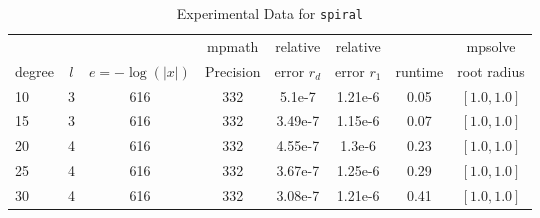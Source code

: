 \documentclass[sigconf]{acmart}
\begin{document}
%

\begin{table}[t]
\caption{Experimental Data for \texttt{spiral}} %
\label{tab:spiral}
\vskip -0.15in
\begin{center}
\begin{small}
\begin{sc}
\begin{tabular}{lccccccc}
\toprule
&  &  & mpmath & relative  & relative &  & mpsolve \\
degree  & $l$& $e=-\log(|x|)$& Precision &error $r_d$       & error $r_1$ &runtime& root radius\\
\midrule
 10 & 3 & 616 & 332 & 5.1e-7 & 1.21e-6 & 0.05 & $[1.0, 1.0]$\\
 15 & 3 & 616 & 332 & 3.49e-7 & 1.15e-6 & 0.07 & $[1.0, 1.0]$\\
 20 & 4 & 616 & 332 & 4.55e-7 & 1.3e-6 & 0.23 & $[1.0, 1.0]$\\
 25 & 4 & 616 & 332 & 3.67e-7 & 1.25e-6 & 0.29 & $[1.0, 1.0]$\\
 30 & 4 & 616 & 332 & 3.08e-7 & 1.21e-6 & 0.41 & $[1.0, 1.0]$\\
\bottomrule
\end{tabular}
\end{sc}
\end{small}
\end{center}
\vskip 0.05in
\end{table}
\end{document}
